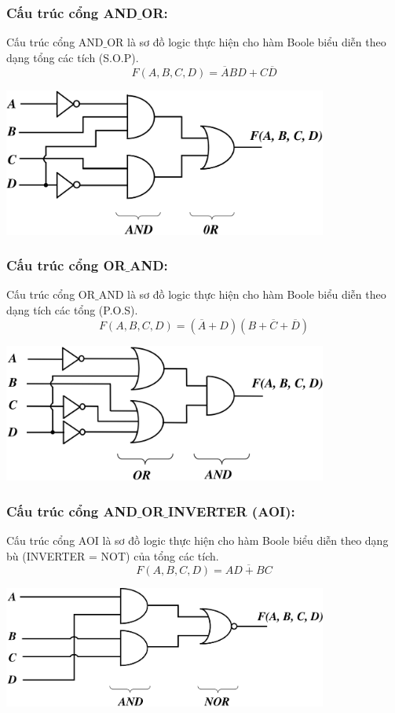 \subsubsection{Cấu trúc cổng AND$\_$OR:}
Cấu trúc cổng AND$\_$OR là sơ đồ logic thực hiện cho hàm Boole biểu diễn theo dạng tổng các tích (S.O.P).
\[
    F(A,B,C,D) = \overline{A}BD + C\overline{D}
\]
\begin{center}
    \includegraphics[width = 0.8\textwidth]{./local/image/39.png}
\end{center}
\subsubsection{Cấu trúc cổng OR$\_$AND:}
Cấu trúc cổng OR$\_$AND là sơ đồ logic thực hiện cho hàm Boole biểu diễn theo dạng tích các tổng (P.O.S).
\[
    F(A,B,C,D) = (\overline{A}+D)(B + \overline{C} + \overline{D})
\]
\begin{center}
    \includegraphics[width = 0.8\textwidth]{./local/image/40.png}
\end{center}
\subsubsection{Cấu trúc cổng AND$\_$OR$\_$INVERTER (AOI):}
Cấu trúc cổng AOI là sơ đồ logic thực hiện cho hàm Boole biểu diễn theo dạng bù (INVERTER = NOT) của tổng các tích.
\[
    F(A,B,C,D) = \overline{AD + BC}
\]
\begin{center}
    \includegraphics[width = 0.8\textwidth]{./local/image/41.png}
\end{center}
